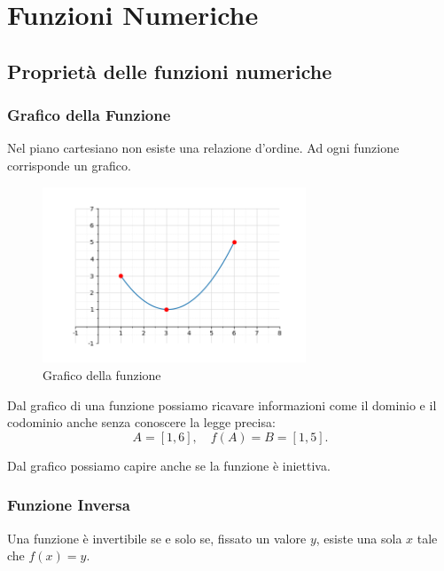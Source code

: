 \documentclass[oneside,10pt]{book} %
\begin{document}
\section{Funzioni Numeriche}
\subsection{Proprietà delle funzioni numeriche}
\subsubsection{Grafico della Funzione}


Nel piano cartesiano non esiste una relazione d'ordine.
Ad ogni funzione corrisponde un grafico.

\begin{figure}[h]
    \centering
    \includegraphics[width=0.7\textwidth]{./img/grafico.png} %
    \caption{Grafico della funzione}
    \label{fig:grafico_della_funzione}
  \end{figure}
  
Dal grafico di una funzione possiamo ricavare informazioni come il dominio e il codominio anche senza conoscere la legge precisa:
\[
A = [1, 6], \quad f(A) = B = [1, 5].
\]

Dal grafico possiamo capire anche se la funzione è iniettiva.

\subsubsection{Funzione Inversa}

Una funzione è invertibile se e solo se, fissato un valore $y$, esiste una sola $x$ tale che $f(x) = y$.
\end{document}
